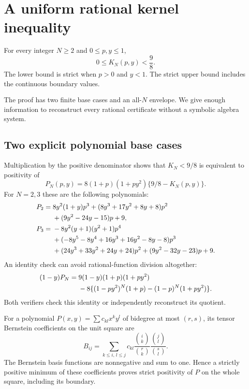 \section{A uniform rational kernel inequality}
\label{sec:ineq}
\begin{theorem}\label{thm:kernel}
For every integer $N\ge2$ and $0\le p,y\le1$,
\begin{equation}\label{eq:kernel-bound}
 0\le K_N(p,y)<\frac98.
\end{equation}
The lower bound is strict when $p>0$ and $y<1$. The strict upper bound includes the continuous boundary values.
\end{theorem}
The proof has two finite base cases and an all-$N$ envelope. We give enough information to reconstruct every rational certificate without a symbolic algebra system.

\subsection{Two explicit polynomial base cases}
Multiplication by the positive denominator shows that $K_N<9/8$ is equivalent to positivity of
\[
 P_N(p,y)=8(1+p)(1+py^2)\{9/8-K_N(p,y)\}.
\]
For $N=2,3$ these are the following polynomials:
\begin{align}
P_2={}&8y^2(1+y)p^3+(8y^3+17y^2+8y+8)p^2\notag\\
&+(9y^2-24y-15)p+9,\label{eq:P2}\\
P_3={}&-8y^2(y+1)(y^2+1)p^4\notag\\
&+(-8y^5-8y^4+16y^3+16y^2-8y-8)p^3\notag\\
&+(24y^3+33y^2+24y+24)p^2
 +(9y^2-32y-23)p+9.\label{eq:P3}
\end{align}
An identity check can avoid rational-function division altogether:
\begin{align}\label{eq:polynomial-check}
(1-y)P_N={}&9(1-y)(1+p)(1+py^2)\notag\\
&-8\{(1-py^2)^N(1+p)-(1-p)^N(1+py^2)\}.
\end{align}
Both verifiers check this identity or independently reconstruct its quotient.

For a polynomial $P(x,y)=\sum c_{kl}x^ky^l$ of bidegree at most $(r,s)$, its tensor Bernstein coefficients on the unit square are
\begin{equation}\label{eq:bernstein}
 B_{ij}=\sum_{k\le i,\,l\le j}c_{kl}
 \frac{\binom ik}{\binom rk}\frac{\binom jl}{\binom sl}.
\end{equation}
The Bernstein basis functions are nonnegative and sum to one. Hence a strictly positive minimum of these coefficients proves strict positivity of $P$ on the whole square, including its boundary.

